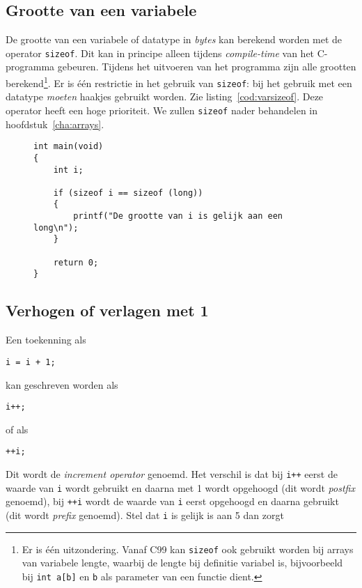 \subsection{Grootte van een variabele}
De grootte van een variabele of datatype in \textsl{bytes} kan berekend worden met de operator \mbox{\texttt{sizeof}}. Dit kan in principe alleen tijdens \textsl{compile-time} van het C-programma gebeuren. Tijdens het uitvoeren van het programma zijn alle grootten berekend\footnote{Er is één uitzondering. Vanaf C99 kan \texttt{sizeof} ook gebruikt worden bij arrays van variabele lengte, waarbij de lengte bij definitie variabel is, bijvoorbeeld bij \texttt{int a[b]} en \texttt{b} als parameter van een functie dient.}. Er is één restrictie in het gebruik van \texttt{sizeof}: bij het gebruik met een datatype \textsl{moeten} haakjes gebruikt worden. Zie listing~\ref{cod:varsizeof}. Deze operator heeft een hoge prioriteit. We zullen \texttt{sizeof} nader behandelen in hoofdstuk~\ref{cha:arrays}.

\begin{figure}[!ht]
\begin{lstlisting}[caption=Gebruik van \texttt{sizeof}.,label=cod:varsizeof]
int main(void)
{
	int i;

    if (sizeof i == sizeof (long))
    {
        printf("De grootte van i is gelijk aan een long\n");
    }

    return 0;
}
\end{lstlisting}
\end{figure}

\subsection{Verhogen of verlagen met 1}
Een toekenning als

\hspace*{1em}\texttt{i = i + 1;}

kan geschreven worden als

\hspace*{1em}\texttt{i++;}

of als 

\hspace*{1em}\texttt{++i;}

Dit wordt de \textsl{increment operator}\indexop{++} genoemd. Het verschil is dat bij \texttt{i++} eerst de waarde van \texttt{i} wordt gebruikt en daarna met 1 wordt opgehoogd (dit wordt \textsl{postfix} genoemd), bij \texttt{++i} wordt de waarde van \texttt{i} eerst opgehoogd en daarna gebruikt (dit wordt \textsl{prefix} genoemd). Stel dat \texttt{i} is gelijk is aan 5 dan zorgt

